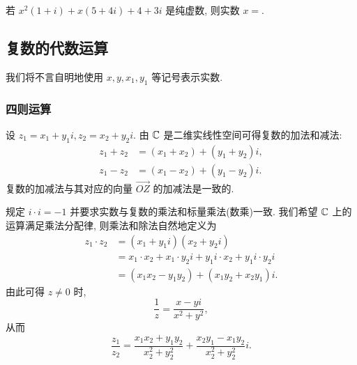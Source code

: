 \begin{exercise}
  若 $x^2(1+i)+x(5+4i)+4+3i$ 是纯虚数, 则实数 $x=$\fillblank{}.
\end{exercise}


\subsection{复数的代数运算}

我们将不言自明地使用 $x,y,x_1,y_1$ 等记号表示实数.

\subsubsection*{四则运算}
设 $z_1=x_1+y_1i,z_2=x_2+y_2i$.
由 ${\mathbb{C}}$ 是二维实线性空间可得复数的加法和减法:
\begin{align*}
  z_1+z_2&=(x_1+x_2)+(y_1+y_2)i,\\
  {z_1-z_2}&{=(x_1-x_2)+(y_1-y_2)i.}
\end{align*}
复数的加减法与其对应的向量 $\overrightarrow{OZ}$ 的加减法是一致的.
\begin{center}
\end{center}

\alert{规定 $i\cdot i=-1$} 并要求实数与复数的乘法和标量乘法(数乘)一致.
我们希望 ${\mathbb{C}}$ 上的运算满足乘法分配律, 则乘法和除法自然地定义为
\begin{align*}
  z_1\cdot z_2&=(x_1+y_1i)(x_2+y_2i)\\
  &=x_1\cdot x_2+x_1\cdot y_2i+y_1i\cdot x_2+y_1i\cdot y_2i\\
  &=(x_1x_2-y_1y_2)+(x_1y_2+x_2y_1)i.
\end{align*}
由此可得 $z\neq0$ 时,
\[\frac1{z}=\frac{x-yi}{x^2+y^2},\]
从而
\[\frac{z_1}{z_2}=\frac{x_1x_2+y_1y_2}{x_2^2+y_2^2}+\frac{x_2y_1-x_1y_2}{x_2^2+y_2^2}i.\]

